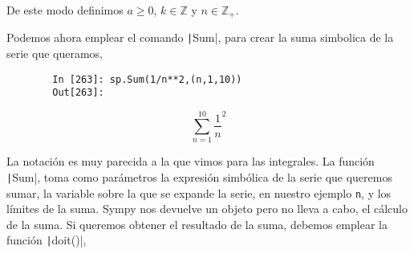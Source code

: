 \begin{paracol}{2}
De este modo definimos $a \ge 0$, $k \in \mathbb{Z}$ y $n \in \mathbb{Z}_+$.

Podemos ahora emplear el comando \texttt|Sum|, para crear la suma simbolica de la serie que queramos,
\end{paracol}
\begin{center}
	\begin{minipage}{.7\textwidth}
		\begin{verbatim}
		In [263]: sp.Sum(1/n**2,(n,1,10))
		Out[263]:	
		\end{verbatim}
		\begin{equation*}
			\sum_{n=1}^{10}\frac{1}{n}^2
		\end{equation*}
	\end{minipage}
\end{center}
\begin{paracol}{2}
La notación es muy parecida a la que vimos para las integrales. La función \texttt|Sum|, toma como parámetros la expresión simbólica de la serie que queremos sumar, la variable sobre la que se expande la serie, en nuestro ejemplo \texttt{n}, y los límites de la suma. Sympy nos devuelve un objeto pero no lleva a cabo, el cálculo de la suma. Si queremos obtener el resultado de la suma, debemos emplear la función \texttt|doit()|,
\end{paracol}

